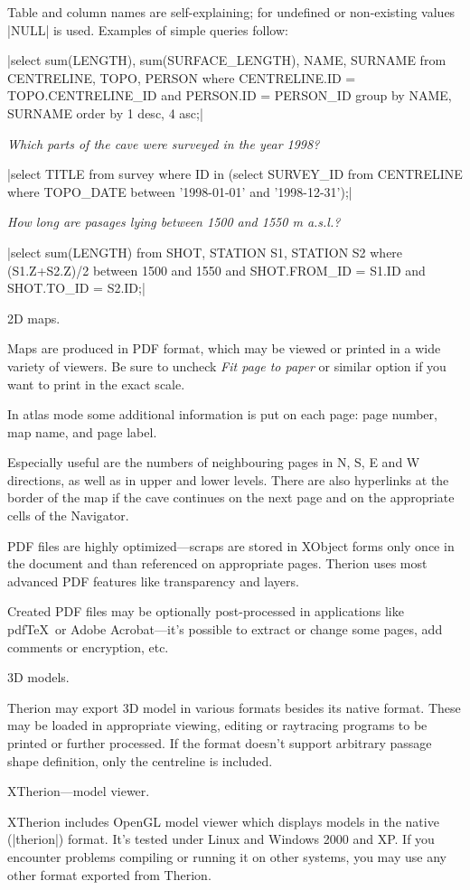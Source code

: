 Table and column names are self-explaining; for undefined or non-existing 
values |NULL| is used. Examples of simple queries follow:


|select sum(LENGTH), sum(SURFACE_LENGTH), NAME, SURNAME 
  from CENTRELINE, TOPO, PERSON 
  where CENTRELINE.ID = TOPO.CENTRELINE_ID and PERSON.ID = PERSON_ID 
  group by NAME, SURNAME order by 1 desc, 4 asc;|

{\it Which parts of the cave were surveyed in the year 1998?}

|select TITLE from survey where ID in 
  (select SURVEY_ID from CENTRELINE 
  where TOPO_DATE between '1998-01-01' and '1998-12-31');|

{\it How long are pasages lying between 1500 and 1550 m a.s.l.?}

|select sum(LENGTH) from SHOT, STATION S1, STATION S2 
  where (S1.Z+S2.Z)/2 between 1500 and 1550 and 
  SHOT.FROM_ID = S1.ID and SHOT.TO_ID = S2.ID;|


\subchapter 2D maps.

Maps are produced in PDF format, which may be viewed or printed in a wide 
variety of viewers. Be sure to uncheck {\it Fit page to paper} or similar 
option if you want to print in the exact scale.

In atlas mode some additional information is put on each page: page 
number, map name, and page label.

Especially useful are the numbers of neighbouring pages in N, S, E and W 
directions, as well as in upper and lower levels. There are also hyperlinks at 
the border of the map if the cave continues on the next page and on the 
appropriate cells of the Navigator.

PDF files are highly optimized---scraps are stored in XObject forms only once 
in the document and than referenced on appropriate pages. 
Therion uses most advanced PDF features like transparency and layers.

Created PDF files may be optionally post-processed in applications like 
pdf\TeX\ or Adobe Acrobat---it's possible to extract or change some pages, add 
comments or encryption, etc.


\subchapter 3D models.

Therion may export 3D model in various formats besides its native format. These 
may be loaded in appropriate viewing, editing or raytracing programs to be 
printed or further processed. If the format doesn't support arbitrary passage 
shape definition, only the centreline is included.

\subsubchapter XTherion---model viewer.

XTherion includes OpenGL model viewer which displays models in the native 
(|therion|) format. It's tested under Linux and Windows 2000 and XP. 
If you encounter problems compiling or running it on other systems, 
you may use any other format exported from Therion.

\endinput
